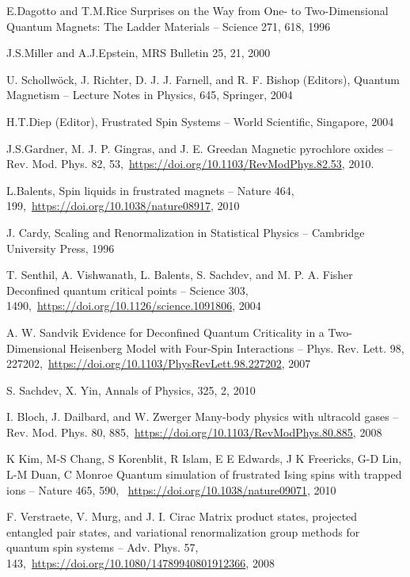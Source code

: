 \documentclass[11pt]{article}
\begin{document}
\begin{thebibliography}{3}
E.Dagotto and T.M.Rice Surprises on the Way from One- to Two-Dimensional Quantum Magnets: The Ladder Materials -- Science 271, 618, 1996

J.S.Miller and A.J.Epstein, MRS Bulletin 25, 21, 2000

U. Schollwöck, J. Richter, D. J. J. Farnell, and R. F. Bishop (Editors), Quantum Magnetism -- Lecture Notes in Physics, 645, Springer, 2004

H.T.Diep (Editor), Frustrated Spin Systems -- World Scientific, Singapore, 2004

J.S.Gardner, M. J. P. Gingras, and J. E. Greedan Magnetic pyrochlore oxides -- Rev. Mod. Phys. 82, 53,~\url{https://doi.org/10.1103/RevModPhys.82.53}, 2010.

L.Balents, Spin liquids in frustrated magnets -- Nature 464, 199,~\url{https://doi.org/10.1038/nature08917}, 2010

J. Cardy, Scaling and Renormalization in Statistical Physics -- Cambridge University Press, 1996

T. Senthil, A. Vishwanath, L. Balents, S. Sachdev, and M. P. A. Fisher Deconfined quantum critical points -- Science 303, 1490,~\url{https://doi.org/10.1126/science.1091806}, 2004

A. W. Sandvik Evidence for Deconfined Quantum Criticality in a Two-Dimensional Heisenberg Model with Four-Spin Interactions -- Phys. Rev. Lett. 98, 227202,~\url{https://doi.org/10.1103/PhysRevLett.98.227202}, 2007

S. Sachdev, X. Yin, Annals of Physics, 325, 2, 2010

I. Bloch, J. Dailbard, and W. Zwerger Many-body physics with ultracold gases -- Rev. Mod. Phys. 80, 885,~\url{https://doi.org/10.1103/RevModPhys.80.885}, 2008

K Kim, M-S Chang, S Korenblit, R Islam, E E Edwards, J K Freericks, G-D Lin, L-M Duan, C Monroe  Quantum simulation of frustrated Ising spins with trapped ions -- Nature 465, 590, ~\url{https://doi.org/10.1038/nature09071}, 2010

F. Verstraete, V. Murg, and J. I. Cirac Matrix product states, projected entangled pair states, and variational renormalization group methods for quantum spin systems -- Adv. Phys. 57, 143,~\url{https://doi.org/10.1080/14789940801912366}, 2008


\end{thebibliography}
\end{document}

